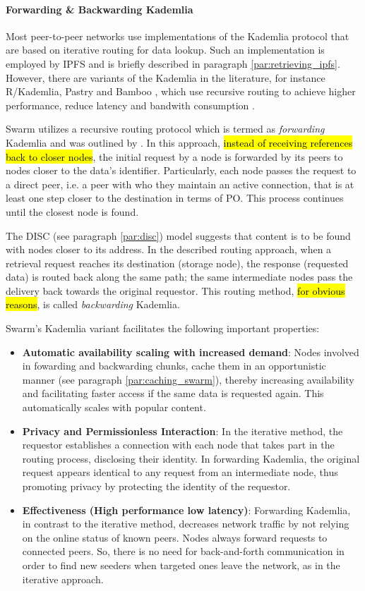 \paragraph{Forwarding \& Backwarding Kademlia}\label{par:forwarding_kademlia}
Most peer-to-peer networks use implementations of the Kademlia protocol that are based on iterative routing for data lookup. Such an implementation is employed by IPFS and is briefly described in paragraph \ref{par:retrieving_ipfs}. However, there are variants of the Kademlia in the literature, for instance R/Kademlia, Pastry and Bamboo \citep{chowdhury_2017},  which use recursive routing to achieve higher performance, reduce latency and bandwith consumption \citep{heep_2010}.

Swarm utilizes a recursive routing protocol which is termed as \textit{forwarding} Kademlia and was outlined by \cite{tron_2018}. In this approach, \hl{instead of receiving references back to closer nodes}, the initial request by a node is forwarded by its peers to nodes closer to the data's identifier. Particularly, each node passes the request to a direct peer, i.e. a peer with who they maintain an active connection, that is at least one step closer to the destination in terms of PO. This process continues until the closest node is found.

The DISC (see paragraph \ref{par:disc}) model suggests that content is to be found with nodes closer to its address. In the described routing approach, when a retrieval request reaches its destination (storage node), the response (requested data) is routed back along the same path; the same intermediate nodes pass the delivery back towards the original requestor. This routing method, \hl{for obvious reasons}, is called \textit{backwarding} Kademlia.

Swarm's Kademlia variant facilitates the following important properties:

\begin{itemize}
    \item \textbf{Automatic availability scaling with increased demand}: Nodes involved in fowarding and backwarding chunks, cache them in an opportunistic manner (see paragraph \ref{par:caching_swarm}), thereby increasing availability and facilitating faster access if the same data is requested again. This automatically scales with popular content. 
    \item \textbf{Privacy and Permissionless Interaction}: In the iterative method, the requestor establishes a connection with each node that takes part in the routing process, disclosing their identity. In forwarding Kademlia, the original request appears identical to any request from an intermediate node, thus promoting privacy by protecting the identity of the requestor.
    \item \textbf{Effectiveness (High performance low latency)}: Forwarding Kademlia, in contrast to the iterative method, decreases network traffic by not relying on the online status of known peers. Nodes always forward requests to connected peers. So, there is no need for back-and-forth communication in order to find new seeders when targeted ones leave the network, as in the iterative approach.
\end{itemize}

